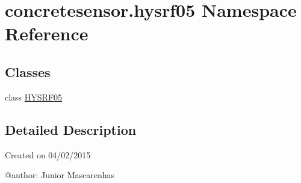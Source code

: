 \hypertarget{namespaceconcretesensor_1_1hysrf05}{}\section{concretesensor.\+hysrf05 Namespace Reference}
\label{namespaceconcretesensor_1_1hysrf05}
\subsection*{Classes}
\begin{DoxyCompactItemize}
\item 
class \hyperlink{classconcretesensor_1_1hysrf05_1_1HYSRF05}{H\+Y\+S\+R\+F05}
\end{DoxyCompactItemize}


\subsection{Detailed Description}
\begin{DoxyVerb}Created on 04/02/2015

@author: Junior Mascarenhas
\end{DoxyVerb}
 